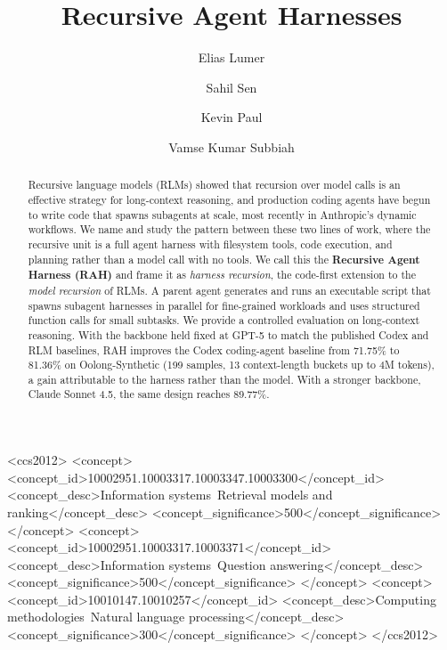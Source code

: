 \documentclass[sigconf,nonacm]{acmart}
\title{Recursive Agent Harnesses}
\author{Elias Lumer}
\affiliation{\institution{PricewaterhouseCoopers, U.S.}\country{}}
\author{Sahil Sen}
\affiliation{\institution{PricewaterhouseCoopers, U.S.}\country{}}
\author{Kevin Paul}
\affiliation{\institution{PricewaterhouseCoopers, U.S.}\country{}}
\author{Vamse Kumar Subbiah}
\affiliation{\institution{PricewaterhouseCoopers, U.S.}\country{}}
\begin{document}

\begin{abstract}
Recursive language models (RLMs) showed that recursion over model calls is an
effective strategy for long-context reasoning, and production coding agents have
begun to write code that spawns subagents at scale, most recently in Anthropic's
dynamic workflows. We name and study the pattern between these two lines of work,
where the recursive unit is a full agent harness with filesystem tools, code
execution, and planning rather than a model call with no tools. We call this the
\textbf{Recursive Agent Harness (RAH)} and frame it as \emph{harness recursion}, the
code-first extension to the \emph{model recursion} of RLMs. A parent agent generates
and runs an executable script that spawns subagent harnesses in parallel for
fine-grained workloads and uses structured function calls for small subtasks. We
provide a controlled evaluation on long-context reasoning. With the backbone held
fixed at GPT-5 to match the published Codex and RLM baselines, RAH improves the Codex
coding-agent baseline from 71.75\% to 81.36\% on Oolong-Synthetic (199 samples, 13
context-length buckets up to 4M tokens), a gain attributable to the harness rather
than the model. With a stronger backbone, Claude Sonnet 4.5, the same design reaches
89.77\%.
\end{abstract}


\begin{CCSXML}
<ccs2012>
  <concept>
    <concept_id>10002951.10003317.10003347.10003300</concept_id>
    <concept_desc>Information systems~Retrieval models and ranking</concept_desc>
    <concept_significance>500</concept_significance>
  </concept>
  <concept>
    <concept_id>10002951.10003317.10003371</concept_id>
    <concept_desc>Information systems~Question answering</concept_desc>
    <concept_significance>500</concept_significance>
  </concept>
  <concept>
    <concept_id>10010147.10010257</concept_id>
    <concept_desc>Computing methodologies~Natural language processing</concept_desc>
    <concept_significance>300</concept_significance>
  </concept>
</ccs2012>
\end{CCSXML}
\end{document}
